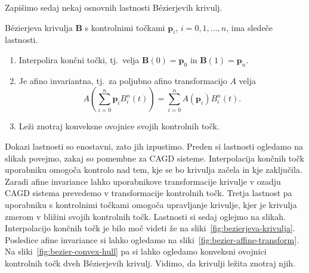 \documentclass[isrm2, tisk]{fmfdelo}
\newcommand{\p}{\mathbf{p}}
\newcommand{\lilb}[2]{B_{#1}^{#2}(t)}
\newcommand{\bernsteinsump}[2]{\sum_{#1=0}^{#2} \p_{#1}\lilb{#1}{#2}}
\newcommand{\bernsteinsumtritri}[3]{\sum_{#1=0}^{#2} #3\lilb{#1}{#2}}
\begin{document}
    Zapišimo sedaj nekaj osnovnih lastnosti Bézierjevih krivulj.
    \begin{izrek}{Bézierjeva krivulja $\mathbf{B}$ s kontrolnimi točkami $\p_i$, $i=0,1,\ldots,n$, ima sledeče lastnosti.}
        \label{izrek:lastnosti-bezierjevih-krivulj}
        \begin{enumerate}
            \item Interpolira končni točki, tj.\ velja $\mathbf{B}(0)=\p_0$ in $\mathbf{B}(1)=\p_n$.
            \item Je afino invariantna, tj.\ za poljubno afino transformacijo $A$ velja \[A \left(\bernsteinsump{i}{n}\right) =\bernsteinsumtritri{i}{n}{A(\p_i)}.\]
            \item Leži znotraj konveksne ovojnice svojih kontrolnih točk.
        \end{enumerate}
    \end{izrek}
    \noindent Dokazi lastnosti so enostavni, zato jih izpustimo.
    Preden si lastnosti ogledamo na slikah povejmo, zakaj so pomembne za CAGD sisteme.
    Interpolacija končnih točk uporabniku omogoča kontrolo nad tem, kje se bo krivulja začela in kje zaključila.
    Zaradi afine invariance lahko uporabnikove transformacije krivulje v ozadju CAGD sistema prevedemo v transformacije kontrolnih točk.
    Tretja lastnost pa uporabniku s kontrolnimi točkami omogoča upravljanje krivulje, kjer je krivulja zmerom v bližini svojih kontrolnih točk.
    Lastnosti si sedaj oglejmo na slikah.
    Interpolacijo končnih točk je bilo moč videti že na sliki~\ref{fig:bezierjeva-krivulja}.
    Posledice afine invariance si lahko ogledamo na sliki~\ref{fig:bezier-affine-transform}.
    Na sliki~\ref{fig:bezier-convex-hull} pa si lahko ogledamo konveksni ovojnici kontrolnih točk dveh Bézierjevih krivulj.
    Vidimo, da krivulji ležita znotraj njih.
\end{document}
